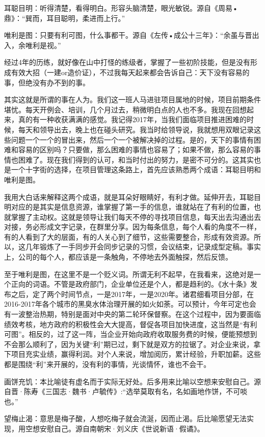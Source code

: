 \documentclass[
]{book}
\begin{document}
耳聪目明：听得清楚，看得明白。形容头脑清楚，眼光敏锐。源自《周易•鼎》：``巽而，耳目聪明，柔进而上行。''

唯利是图：只要有利可图，什么事都干。源自《左传•成公十三年》：``余虽与晋出入，余唯利是视。''

经过4年的历练，就好像在山中打怪的练级者，掌握了一些初阶技能，但是没有形成有效大招（一建or造价证），不过我每天起来都会告诉自己：天下没有容易的事，但绝没有办不到的事。

其实这就是所谓的事在人为。我们这一班人马进驻项目属地的时候，项目前期条件堪忧。每天开例会、培训，几个月过去，稍微明白点的人也不多。我现在回想起来，真的有一种收获满满的感觉。我记得2017年，当我们面临项目推进困难的时候，每天和领导出去，晚上也在碰头研究。我当时给领导说，我就想用双眼记录这些问题一个一个的冒出来，然后一个一个被解决掉的过程。是的，天下的事情有困难和容易的区别吗？只要做，那么困难的事情也容易了；如果不做，那么容易的事情也困难了。现在我们得到的认可，和当时付出的努力，是密不可分的。这其实也是一个十字街的选择，在项目管理这条路上，首先应该熟悉两个成语：耳聪目明和唯利是图。

我用大白话来解释这两个成语，就是耳朵好眼睛好，有利才做。延伸开去，耳聪目明对应的是其实是信息资源，谁掌握了第一手的信息，谁就站在了有利的位置，也就掌握了主动权。这就是领导让我们每天不停的寻找项目信息，每天出去沟通出去对接，务必形成文字记录，在群里分享。因为每条信息，每个人看的角度不一样，有的人看到了大的层面，有的人关心到了细节，这些需要整合，形成有效资源。所以，这几年锻炼了一手同步开会同步记录的习惯，会议结束，记录成型定稿。事实上，公司的每个人，都应该是一条触角，不停地去外面触探，然后反馈。

至于唯利是图，在这里不是一个贬义词。所谓无利不起早，在我看来，这绝对是一个正向的词语。不管是政府部门，企业单位还是个人，都是趋利的。《水十条》发布之后，定了两个时间节点，一是2017年，一是2020年。诸君细看项目分部，在2016-2017年各个城市的黑臭水体治理开展的如火如荼。可以预计，今年可定也会有一波整治热期，特别是面对中央的第二轮环保督察。在这个过程中，因为要面临绩效考核，地方政府的积极性会大大提高，督促各项目加快进度，这当然是``有利可图''。相反的，过了这一阵，当企业开始向政府收取服务费的时候，便能预想到不会那么顺利了，因为关键``利''期已过，剩下就是双方的拉锯了。对企业来说，拿下项目充实业绩，赢得利润。对个人来说，增加阅历，累计经验，升职加薪。这些都是围绕``利''来开展的，没有利的事情，光谈情怀，谁也不会干。

画饼充饥：本比喻徒有虚名而于实际无好处。后多用来比喻以空想来安慰自己。源自晋·陈寿《三国志·魏书·卢毓传》:``选举莫取有名，名如画地作饼，不可啖也。''

望梅止渴：意思是梅子酸，人想吃梅子就会流涎，因而止渴。后比喻愿望无法实现，用空想安慰自己。源自南朝宋·刘义庆《世说新语·假谲》。
\end{document}
